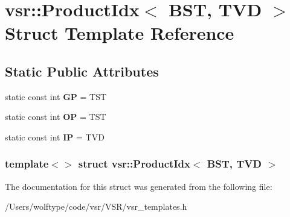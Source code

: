 \hypertarget{structvsr_1_1_product_idx_3_01_b_s_t_00_01_t_v_d_01_4}{\section{vsr\-:\-:Product\-Idx$<$ B\-S\-T, T\-V\-D $>$ Struct Template Reference}
\label{structvsr_1_1_product_idx_3_01_b_s_t_00_01_t_v_d_01_4}
}
\subsection*{Static Public Attributes}
\begin{DoxyCompactItemize}
\item 
\hypertarget{structvsr_1_1_product_idx_3_01_b_s_t_00_01_t_v_d_01_4_a8ef8eabd32de0678902f4603f46c633b}{static const int {\bfseries G\-P} = T\-S\-T}\label{structvsr_1_1_product_idx_3_01_b_s_t_00_01_t_v_d_01_4_a8ef8eabd32de0678902f4603f46c633b}

\item 
\hypertarget{structvsr_1_1_product_idx_3_01_b_s_t_00_01_t_v_d_01_4_a101ffcd3ca915496706eb64975055778}{static const int {\bfseries O\-P} = T\-S\-T}\label{structvsr_1_1_product_idx_3_01_b_s_t_00_01_t_v_d_01_4_a101ffcd3ca915496706eb64975055778}

\item 
\hypertarget{structvsr_1_1_product_idx_3_01_b_s_t_00_01_t_v_d_01_4_abd6d8c5b34eab1c967d1a7e3828bc76c}{static const int {\bfseries I\-P} = T\-V\-D}\label{structvsr_1_1_product_idx_3_01_b_s_t_00_01_t_v_d_01_4_abd6d8c5b34eab1c967d1a7e3828bc76c}

\end{DoxyCompactItemize}
\subsubsection*{template$<$$>$ struct vsr\-::\-Product\-Idx$<$ B\-S\-T, T\-V\-D $>$}



The documentation for this struct was generated from the following file\-:\begin{DoxyCompactItemize}
\item 
/\-Users/wolftype/code/vsr/\-V\-S\-R/vsr\-\_\-templates.\-h\end{DoxyCompactItemize}
